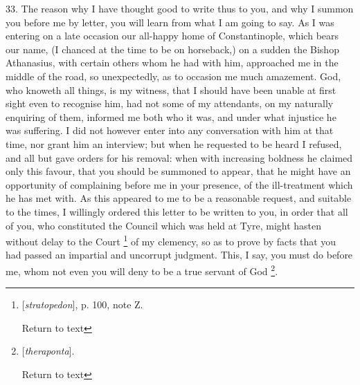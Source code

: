 33. The reason why I have thought good to write
thus to you, and why I summon you before me by letter, you will learn
from what I am going to say. As I was entering on a late occasion our
all-happy home of Constantinople, which bears our name, (I chanced at
the time to be on horseback,) on a sudden the Bishop Athanasius, with
certain others whom he had with him, approached me in the middle of
the road, so unexpectedly, as to occasion me much amazement. God, who
knoweth all things, is my witness, that I should have been unable at
first sight even to recognise him, had not some of my attendants, on
my naturally enquiring of them, informed me both who it was, and under
what injustice he was suffering. I did not however enter into any
conversation with him at that time, nor grant him an interview; but
when he requested to be heard I refused, and all but gave orders
for his removal: when with increasing boldness he claimed only this
favour, that you should be summoned to appear, that he might have an
opportunity of complaining before me in your presence, of the
ill-treatment which he has met with. As this appeared to me to be a
reasonable request, and suitable to the times, I willingly ordered
this letter to be written to you, in order that all of you, who
constituted the Council which was held at Tyre, might hasten without
delay to the Court \footnote{[\emph{stratopedon}], p. 100, note Z.

Return to text}
of my clemency, so as to prove by facts that you had passed an
impartial and uncorrupt judgment. This, I say, you must do before me,
whom not even you will deny to be a true servant of God \footnote{[\emph{theraponta}].

Return to text}.

